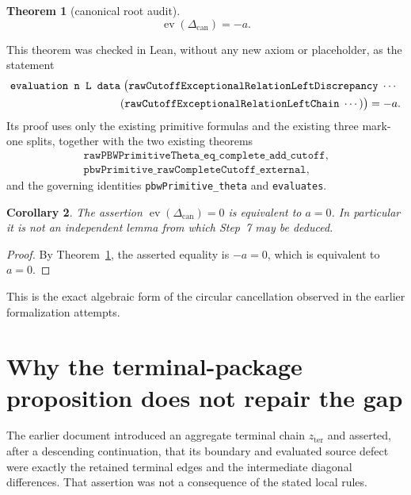 \documentclass[11pt]{article}
\newtheorem{theorem}{Theorem}[section]
\newtheorem{corollary}[theorem]{Corollary}
\theoremstyle{definition}
\theoremstyle{remark}
\newcommand{\ev}{\operatorname{ev}}
\begin{document}
\begin{theorem}[canonical root audit]\label{thm:canonical-audit}
\begin{equation}
                         \ev(\Delta_{\mathrm{can}})=-a.      \label{eq:canonical-eval}
\end{equation}
\end{theorem}

This theorem was checked in Lean, without any new axiom or placeholder, as
the statement
\[
\begin{split}
&\texttt{evaluation n L data}\;\bigl(
  \texttt{rawCutoffExceptionalRelationLeftDiscrepancy}\;\cdots\\
&\hspace{35mm}
  (\texttt{rawCutoffExceptionalRelationLeftChain}\;\cdots)\bigr)
  =-a.
\end{split}
\]
Its proof uses only the existing primitive formulas and the existing three
mark-one splits, together with the two existing theorems
\begin{gather*}
 \texttt{rawPBWPrimitiveTheta\_eq\_complete\_add\_cutoff},\\
 \texttt{pbwPrimitive\_rawCompleteCutoff\_external},
\end{gather*}
and the governing identities \texttt{pbwPrimitive\_theta} and
\texttt{evaluates}.

\begin{corollary}\label{cor:circular}
The assertion \(\ev(\Delta_{\mathrm{can}})=0\) is equivalent to \(a=0\).
In particular it is not an independent lemma from which Step~7 may be
deduced.
\end{corollary}

\begin{proof}
By Theorem~\ref{thm:canonical-audit}, the asserted equality is
\(-a=0\), which is equivalent to \(a=0\).
\end{proof}

This is the exact algebraic form of the circular cancellation observed in
the earlier formalization attempts.

\section{Why the terminal-package proposition does not repair the gap}

The earlier document introduced an aggregate terminal chain
\(z_{\mathrm{ter}}\) and asserted, after a descending continuation, that
its boundary and evaluated source defect were exactly the retained terminal
edges and the intermediate diagonal differences.  That assertion was not a
consequence of the stated local rules.
\end{document}

